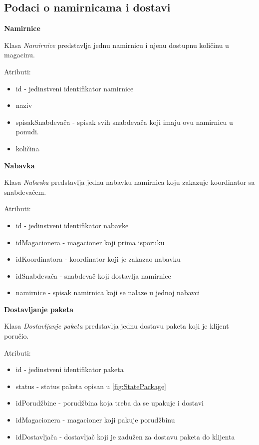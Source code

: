 \subsection{Podaci o namirnicama i dostavi}

\textbf{\large Namirnice}
\vspace{0.3cm}

Klasa \textit{Namirnice} predstavlja jednu namirnicu i njenu dostupnu količinu u magacinu.

Atributi:
\begin{itemize}
    \item id - jedinstveni identifikator namirnice
    \item naziv 
    \item spisakSnabdevača - spisak svih snabdevača koji imaju ovu namirnicu u ponudi.
    \item količina
\end{itemize}

\textbf{\large Nabavka}
\vspace{0.3cm}

Klasa \textit{Nabavka} predstavlja jednu nabavku namirnica koju zakazuje koordinator sa snabdevačem.

Atributi:
\begin{itemize}
    \item id - jedinstveni identifikator nabavke
    \item idMagacionera - magacioner koji prima isporuku 
    \item idKoordinatora - koordinator koji je zakazao nabavku
    \item idSnabdevača - snabdevač koji dostavlja namirnice
    \item namirnice - spisak namirnica koji se nalaze u jednoj nabavci
\end{itemize}

\textbf{\large Dostavljanje paketa}
\vspace{0.3cm}

Klasa \textit{Dostavljanje paketa} predstavlja jednu dostavu paketa  koji je klijent poručio.

Atributi:
\begin{itemize}
    \item id - jedinstveni identifikator paketa
    \item status - status paketa opisan u \ref{fig:StatePackage}
    \item idPorudžbine - porudžbina koja treba da se upakuje i dostavi
    \item idMagacionera - magacioner koji pakuje porudžbinu
    \item idDostavljača - dostavljač koji je zadužen za dostavu paketa do klijenta
\end{itemize}